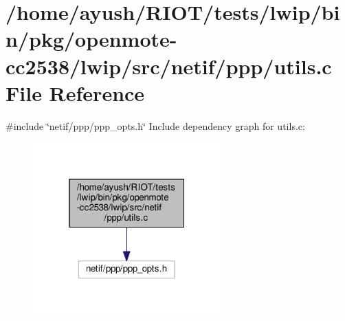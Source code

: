 \hypertarget{openmote-cc2538_2lwip_2src_2netif_2ppp_2utils_8c}{}\section{/home/ayush/\+R\+I\+O\+T/tests/lwip/bin/pkg/openmote-\/cc2538/lwip/src/netif/ppp/utils.c File Reference}
\label{openmote-cc2538_2lwip_2src_2netif_2ppp_2utils_8c}
{\ttfamily \#include \char`\"{}netif/ppp/ppp\+\_\+opts.\+h\char`\"{}}\newline
Include dependency graph for utils.\+c\+:
\nopagebreak
\begin{figure}[H]
\begin{center}
\leavevmode
\includegraphics[width=205pt]{openmote-cc2538_2lwip_2src_2netif_2ppp_2utils_8c__incl}
\end{center}
\end{figure}
